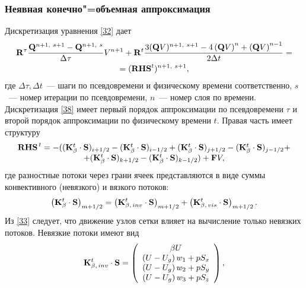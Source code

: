 \subsubsection{Неявная конечно"=объемная аппроксимация}
\label{s:1252}
Дискретизация уравнения \eqref{32} дает
\begin{gather}
  {\bf{R}}^\tau  \frac{{{\bf{Q}}^{n + 1,\ s + 1}  -
  {\bf{Q}}^{n + 1,\ s} }}{{\Delta \tau }}V^{n + 1}  + 
  {\bf{R}}^t \frac{{3({\bf{Q}}V)^{n + 1,\ s + 1}  - 4\left( {{\bf{Q}}V}
  \right)^n  + \left( {{\bf{Q}}V} \right)^{n - 1} }}{{2\Delta t}} = \notag \\
  = ({\bf{RHS}}^{t} )^{n + 1,\ s + 1},
  \label{38}
\end{gather}
где $\Delta \tau, \Delta t$~--- шаги по псевдовремени и физическому времени соответственно, $s$~--- номер 
итерации по псевдовремени, $n$~--- номер слоя по времени. Дискретизация \eqref{38} имеет первый порядок 
аппроксимации по псевдовремени $\tau$ и второй порядок аппроксимации по физическому времени $t$. Правая часть
имеет структуру
\begin{equation*}
  \begin{array}{c}
  {\bf{RHS}}^{\,t}  =  - (({\bf{K}}^t_{\beta}  \cdot {\bf{S}})_{i + 1/2}  - ({\bf{K}}^t_{\beta}  
  \cdot {\bf{S}})_{i - 1/2} + ({\bf{K}}^t_{\beta}  \cdot {\bf{S}})_{j + 1/2} -
  ({\bf{K}}^t_{\beta} \cdot {\bf{S}})_{j - 1/2}  + \\ +
  ({\bf{K}}^t_{\beta} \cdot {\bf{S}})_{k + 1/2}  -
  ({\bf{K}}^t_{\beta} \cdot {\bf{S}})_{k - 1/2} ) + {\bf{F}}V,
\end{array}
\end{equation*}
где разностные потоки через грани ячеек представляются в виде суммы конвективного (невязкого) и вязкого 
потоков:
\begin{equation}
  \label{39} 
  \left( {{\bf{K}}^t_{\beta}  \cdot {\bf{S}}} \right)_{m + 1/2} = \left( {{\bf{K}}_{\beta,\, inv}^t  
  \cdot {\bf{S}}} \right)_{m + 1/2}  + \left( {{\bf{K}}_{\beta,\, vis}^t  
  \cdot {\bf{S}}} \right)_{m + 1/2}.
\end{equation}
Из \eqref{33} следует, что движение узлов сетки влияет на вычисление только невязких потоков. Невязкие потоки
имеют вид
\begin{equation}
  \label{40} 
  {{\bf{K}}_{\beta,\, inv}^t  \cdot {\bf{S}}} = \left(
  {\begin{array}{*{20}c}
   \beta U  \\
   {\left( {U - U_g } \right)w_1 + pS_x }  \\
   {\left( {U - U_g } \right)w_2 + pS_y }  \\
   {\left( {U - U_g } \right)w_3 + pS_z }  \\
\end{array}} \right),
\end{equation}
